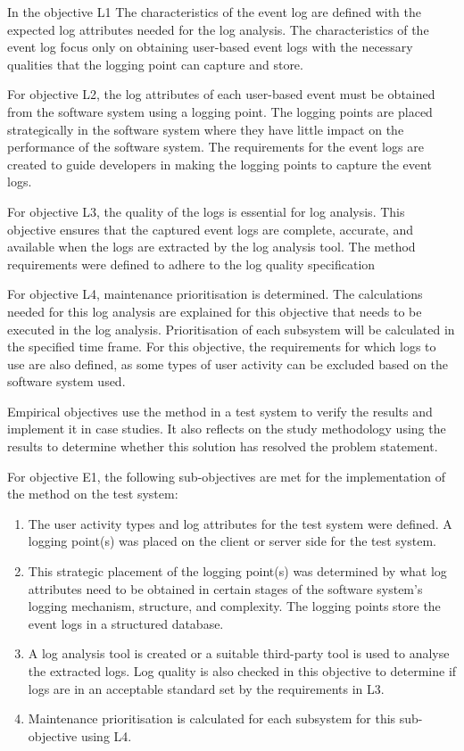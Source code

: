 \begin{enumerate}[label=\textbf{\Roman*.}]
    In  the objective L1 The characteristics of the event log are defined with the expected log attributes needed for the log analysis. The characteristics of the event log focus only on obtaining user-based event logs with the necessary qualities that the logging point can capture and store.\par For objective L2, the log attributes of each user-based event must be obtained from the software system using a logging point. The logging points are placed strategically in the software system where they have little impact on the performance of the software system. The requirements for the event logs are created to guide developers in making the logging points to capture the event logs. \par For objective L3, the quality of the logs is essential for log analysis. This objective ensures that the captured event logs are complete, accurate, and available when the logs are extracted by the log analysis tool. The method requirements were defined to adhere to the log quality specification\par For objective L4, maintenance prioritisation is determined. The calculations needed for this log analysis are explained for this objective that needs to be executed in the log analysis. Prioritisation of each subsystem will be calculated in the specified time frame. For this objective, the requirements for which logs to use are also defined, as some types of user activity can be excluded based on the software system used.\par Empirical objectives use the method in a test system to verify the results and implement it in case studies. It also reflects on the study methodology using the results to determine whether this solution has resolved the problem statement.\par For objective E1, the following sub-objectives are met for the implementation of the method on the test system:

		\begin{enumerate}
			\item The user activity types and log attributes for the test system were defined. A logging point(s) was placed on the client or server side for the test system.
			\item This strategic placement of the logging point(s) was determined by what log attributes need to be obtained in certain stages of the software system's logging mechanism, structure, and complexity. The logging points store the event logs in a structured database.
			\item A log analysis tool is created or a suitable third-party tool is used to analyse the extracted logs. Log quality is also checked in this objective to determine if logs are in an acceptable standard set by the requirements in L3. 
			\item Maintenance prioritisation is calculated for each subsystem for this sub-objective using L4.
		\end{enumerate} 


\end{enumerate}
